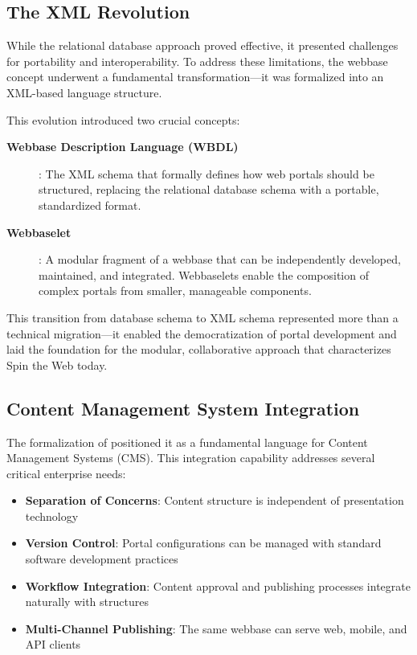\subsection{The XML Revolution}

While the relational database approach proved effective, it presented challenges for portability and interoperability. To address these limitations, the webbase concept underwent a fundamental transformation—it was formalized into an XML-based language structure.

This evolution introduced two crucial concepts:

\begin{description}
\item[\textbf{Webbase Description Language (WBDL)}]: The XML schema that formally defines how web portals should be structured, replacing the relational database schema with a portable, standardized format.

\item[\textbf{Webbaselet}]: A modular fragment of a webbase that can be independently developed, maintained, and integrated. Webbaselets enable the composition of complex portals from smaller, manageable components.
\end{description}

This transition from database schema to XML schema represented more than a technical migration—it enabled the democratization of portal development and laid the foundation for the modular, collaborative approach that characterizes Spin the Web today.

\subsection{Content Management System Integration}

The formalization of \wbdl{} positioned it as a fundamental language for Content Management Systems (CMS). This integration capability addresses several critical enterprise needs:

\begin{itemize}
\item \textbf{Separation of Concerns}: Content structure is independent of presentation technology
\item \textbf{Version Control}: Portal configurations can be managed with standard software development practices
\item \textbf{Workflow Integration}: Content approval and publishing processes integrate naturally with \wbdl{} structures
\item \textbf{Multi-Channel Publishing}: The same webbase can serve web, mobile, and API clients
\end{itemize}

